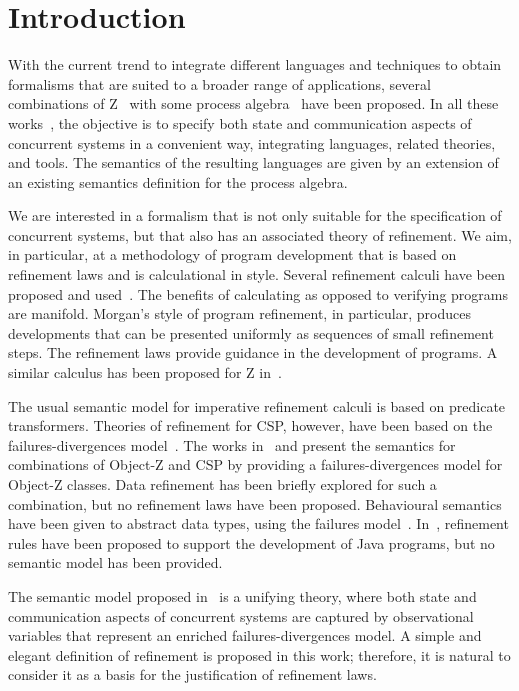 \documentclass{article}
\begin{document}
\section{Introduction}

With the current trend to integrate different languages and techniques
to obtain formalisms that are suited to a broader range of
applications, several combinations of
Z~\cite{ZStandard,Spi88,Spi92,Spi95,WD96} with some process
algebra~\cite{Hoa85,Mil89,Ros98} have been proposed.  In all these
works~\cite{Fis98}, the objective is to specify both state and
communication aspects of concurrent systems in a convenient way,
integrating languages, related theories, and tools.  The semantics of
the resulting languages are given by an extension of an existing
semantics definition for the process algebra.

We are interested in a formalism that is not only suitable for the
specification of concurrent systems, but that also has an associated
theory of refinement.  We aim, in particular, at a methodology of
program development that is based on refinement laws and is
calculational in style.  Several refinement calculi have been proposed
and used~\cite{BW98,Mor94,Mor87c}.  The benefits of calculating as
opposed to verifying programs are manifold.  Morgan's style of program
refinement, in particular, produces developments that can be presented
uniformly as sequences of small refinement steps.  The refinement laws
provide guidance in the development of programs.  A similar calculus
has been proposed for Z in~\cite{CW99,Cav97}.

The usual semantic model for imperative refinement calculi is based on
predicate transformers.  Theories of refinement for CSP, however, have
been based on the failures-divergences model~\cite{Hoa85,Ros98}.  The
works in~\cite{Smi97} and \cite{Fis97,Fis00} present the semantics for
combinations of Object-Z and CSP by providing a failures-divergences
model for Object-Z classes.  Data refinement has been briefly explored
for such a combination, but no refinement laws have been proposed.
Behavioural semantics have been given to abstract data types, using
the failures model~\cite{WDB00}.  In~\cite{CS00}, refinement rules
have been proposed to support the development of Java programs, but no
semantic model has been provided.

The semantic model proposed in~\cite{HH98} is a unifying theory, where
both state and communication aspects of concurrent systems are
captured by observational variables that represent an enriched
failures-divergences model.  A simple and elegant definition of
refinement is proposed in this work; therefore, it is natural to
consider it as a basis for the justification of refinement laws.
\end{document}
